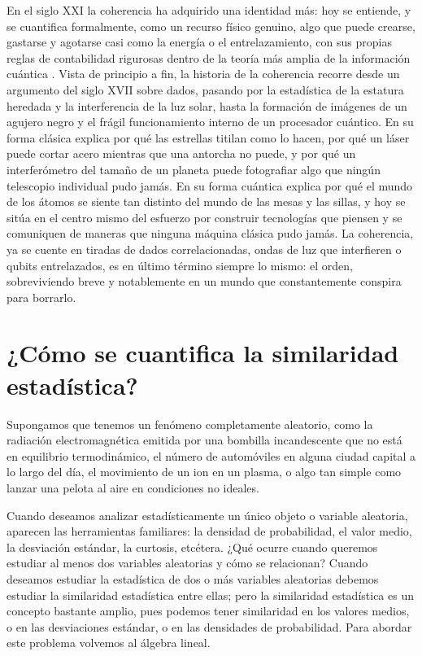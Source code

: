 	En el siglo XXI la coherencia ha adquirido una identidad más: hoy se entiende, y se cuantifica formalmente, como un recurso físico genuino, algo que puede crearse, gastarse y agotarse casi como la energía o el entrelazamiento, con sus propias reglas de contabilidad rigurosas dentro de la teoría más amplia de la información cuántica \cite{baumgratz2014quantifying}. Vista de principio a fin, la historia de la coherencia recorre desde un argumento del siglo XVII sobre dados, pasando por la estadística de la estatura heredada y la interferencia de la luz solar, hasta la formación de imágenes de un agujero negro y el frágil funcionamiento interno de un procesador cuántico. En su forma clásica explica por qué las estrellas titilan como lo hacen, por qué un láser puede cortar acero mientras que una antorcha no puede, y por qué un interferómetro del tamaño de un planeta puede fotografiar algo que ningún telescopio individual pudo jamás. En su forma cuántica explica por qué el mundo de los átomos se siente tan distinto del mundo de las mesas y las sillas, y hoy se sitúa en el centro mismo del esfuerzo por construir tecnologías que piensen y se comuniquen de maneras que ninguna máquina clásica pudo jamás. La coherencia, ya se cuente en tiradas de dados correlacionadas, ondas de luz que interfieren o qubits entrelazados, es en último término siempre lo mismo: el orden, sobreviviendo breve y notablemente en un mundo que constantemente conspira para borrarlo.

\section{¿Cómo se cuantifica la similaridad estadística?}

	Supongamos que tenemos un fenómeno completamente aleatorio, como la radiación electromagnética emitida por una bombilla incandescente que no está en equilibrio termodinámico, el número de automóviles en alguna ciudad capital a lo largo del día, el movimiento de un ion en un plasma, o algo tan simple como lanzar una pelota al aire en condiciones no ideales.

	Cuando deseamos analizar estadísticamente un único objeto o variable aleatoria, aparecen las herramientas familiares: la densidad de probabilidad, el valor medio, la desviación estándar, la curtosis, etcétera. ¿Qué ocurre cuando queremos estudiar al menos dos variables aleatorias y cómo se relacionan? Cuando deseamos estudiar la estadística de dos o más variables aleatorias debemos estudiar la similaridad estadística entre ellas; pero la similaridad estadística es un concepto bastante amplio, pues podemos tener similaridad en los valores medios, o en las desviaciones estándar, o en las densidades de probabilidad. Para abordar este problema volvemos al álgebra lineal.

